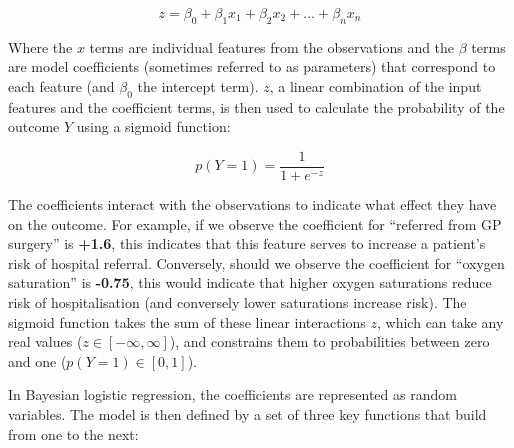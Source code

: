 \begin{equation}
    z = \beta_0 + \beta_{1}x_{1} + \beta_{2}x_{2} + \dots + \beta_{n}x_{n}\label{eq:equation3}
\end{equation}

Where the $x$ terms are individual features from the observations and the $\beta$ terms are model coefficients (sometimes referred to as parameters) that correspond to each feature (and $\beta_0$ the intercept term). $z$, a linear combination of the input features and the coefficient terms, is then used to calculate the probability of the outcome $Y$ using a sigmoid function:

\begin{equation}
    p(Y = 1) = \frac{1}{1 + e^{-z}}\label{eq:equation4}
\end{equation}

The coefficients interact with the observations to indicate what effect they have on the outcome. For example, if we observe the coefficient for ``referred from GP surgery'' is \textbf{+1.6}, this indicates that this feature serves to increase a patient's risk of hospital referral. Conversely, should we observe the coefficient for ``oxygen saturation'' is \textbf{-0.75}, this would indicate that higher oxygen saturations reduce risk of hospitalisation (and conversely lower saturations increase risk). The sigmoid function takes the sum of these linear interactions $z$, which can take any real values ($z \in [-\infty, \infty]$), and constrains them to probabilities between zero and one ($p(Y = 1) \in [0,1]$).

In Bayesian logistic regression, the coefficients are represented as random variables. The model is then defined by a set of three key functions that build from one to the next:

